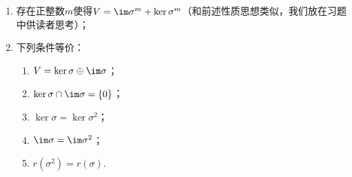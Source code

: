 \begin{enumerate}
\begin{proof}
\begin{enumerate}
                        这一点表明核空间随着线性变换的幂次增长而增长（至少不减），下面一点将说明这一不减序列一旦某个包含符号可以取等号，那么此后的项都相等.

                  \item 任取$k>0$，由（1）可知$\ker \sigma^{m+k}\subseteq\ker \sigma^{m+k+1}$，故只需证$\ker \sigma^{m+k+1}\subseteq\ker\sigma^{m+k}$. 事实上，设$\alpha\in\ker \sigma^{m+k+1}$，则$0=\sigma^{m+k+1}(\alpha)=\sigma^{m+1}(\sigma^k(\alpha))$，即$\sigma^k(\alpha)\in\ker\sigma^{m+1}$. 又$\ker \sigma^m=\ker \sigma^{m+1}$，则$\sigma^k(\alpha)\in\ker\sigma^m\implies\sigma^m(\sigma^k(\alpha))=0\implies\sigma^{m+k}(\alpha)=0\implies\alpha\in\ker\sigma^{m+k}$，故$\ker \sigma^{m+k+1}\subseteq\ker\sigma^{m+k}$，因此$\ker \sigma^{m+k+1}=\ker\sigma^{m+k}$，故$\ker \sigma^m=\ker \sigma^{m+1}=\ker \sigma^{m+2}=\ker \sigma^{m+3}=\cdots$.

                  \item 由上一点知只需证$\ker \sigma^n=\ker \sigma^{n+1}$. 用反证法，则链条$\{0\}=\ker\sigma^0\subsetneqq\ker\sigma^1\subsetneqq\cdots\subsetneqq\ker\sigma^{n+1}$一定是递增的真包含链条（否则其中会有相邻两项相等，与反证假设矛盾），从而这一递增链条每处严格包含于的维数必然增加1，因此$\dim\ker\sigma^{n+1}\geqslant n+1>n$，但我们知道$\ker\sigma^{n+1}$是$V$的子空间，因此矛盾！故命题成立.
              \end{enumerate}
          \end{proof}
          对于像空间而言也有类似于\autoref{thm:核空间性质} 的定理，证明方法也是类似的，我们放在习题中供读者思考.

    \item 存在正整数$m$使得$V=\im \sigma^m+\ker\sigma^m$（和前述性质思想类似，我们放在习题中供读者思考）；

    \item 下列条件等价：
          \begin{enumerate}
              \item $V=\ker\sigma\oplus\im \sigma$；

              \item $\ker\sigma \cap \im \sigma=\{0\}$；

              \item $\ker\sigma=\ker\sigma^2$；

              \item $\im \sigma=\im \sigma^2$；

              \item $r(\sigma^2)=r(\sigma)$.
          \end{enumerate}


\end{enumerate}
